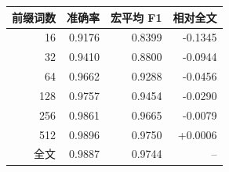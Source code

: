 \begin{tabular}{rrrr}
\toprule
前缀词数 & 准确率 & 宏平均 F1 & 相对全文 \\
\midrule
16 & 0.9176 & 0.8399 & -0.1345 \\
32 & 0.9410 & 0.8800 & -0.0944 \\
64 & 0.9662 & 0.9288 & -0.0456 \\
128 & 0.9757 & 0.9454 & -0.0290 \\
256 & 0.9861 & 0.9665 & -0.0079 \\
512 & 0.9896 & 0.9750 & +0.0006 \\
全文 & 0.9887 & 0.9744 & -- \\
\bottomrule
\end{tabular}

